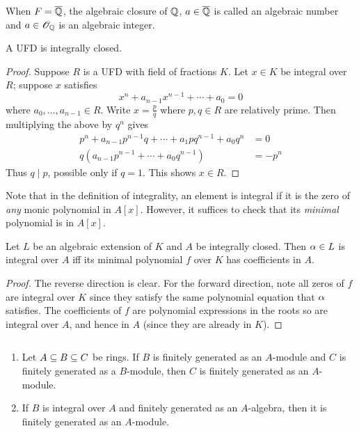 When $F=\overline{\mathbb{Q}}$, the algebraic closure of $\mathbb{Q}$, $a\in \overline{\mathbb{Q}}$ is called an algebraic number and $a\in \mathscr{O}_{\mathbb{Q}}$ is an algebraic integer.
\begin{thm}
A UFD is integrally closed.
\end{thm}
\begin{proof}
Suppose $R$ is a UFD with field of fractions $K$. Let $x\in K$ be integral over $R$; suppose $x$ satisfies
\[
x^n+a_{n-1}x^{n-1}+\cdots +a_0=0
\]
where $a_0,\ldots, a_{n-1}\in R$. Write $x=\frac pq$ where $p,q\in R$ are relatively prime. Then multiplying the above by $q^n$ gives
\begin{align*}
p^n+a_{n-1}p^{n-1}q+\cdots +a_1pq^{n-1} +a_0q^n&=0\\
q(a_{n-1}p^{n-1}+\cdots +a_0q^{n-1})&=-p^n
\end{align*}
Thus $q\mid p$, possible only if $q=1$. This shows $x\in R$.
\end{proof}
Note that in the definition of integrality, an element is integral if it is the zero of {\it any} monic polynomial in $A[x]$. However, it suffices to check that its {\it minimal} polynomial is in $A[x]$.
\begin{pr}
Let $L$ be an algebraic extension of $K$ and $A$ be integrally closed. Then $\alpha\in L$ is integral over $A$ iff its minimal polynomial $f$ over $K$ has coefficients in $A$.
\end{pr}
\begin{proof}
The reverse direction is clear. For the forward direction, note all zeros of $f$ are integral over $K$ since they satisfy the same polynomial equation that $\alpha$ satisfies. The coefficients of $f$ are polynomial expressions in the roots so are integral over $A$, and hence in $A$ (since they are already in $K$).
\end{proof}
\begin{pr}$\,$
\vspace{0cm}
\begin{enumerate}
\item Let $A\subseteq B\subseteq C$ be rings. If $B$ is finitely generated as an $A$-module and $C$ is finitely generated as a $B$-module, then $C$ is finitely generated as an $A$-module.
\item If $B$ is integral over $A$ and finitely generated as an $A$-algebra, then it is finitely generated as an $A$-module.\qedhere
\end{enumerate}
\end{pr}
